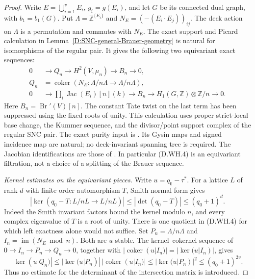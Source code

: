 \begin{proof}
Write \(E=\bigcup_{i=1}^v E_i\), \(g_i=g(E_i)\),
and let \(G\) be its connected dual graph, with
\(b_1=b_1(G)\). Put
\(\Lambda=\mathbb Z^{\{E_i\}}\) and
\(N_E=(-(E_i\cdot E_j))_{ij}\).
The deck action on \(\Lambda\) is a permutation
and commutes with \(N_E\).
The exact support and Picard calculation in
Lemma~\ref{D:SNC-general-Brauer-geometry} is natural
for isomorphisms of the regular pair. It gives
the following two equivariant exact sequences:
\[
 \begin{aligned}
 0&\longrightarrow Q_n\longrightarrow H^2(V,\mu_n)
             \longrightarrow B_n\longrightarrow0,\\
 Q_n&=\operatorname{coker}(N_E:\Lambda/n\Lambda
                                      \to\Lambda/n\Lambda),\\
 0&\longrightarrow\prod_i\operatorname{Jac}(E_i)[n](k)
       \longrightarrow B_n
       \longrightarrow H_1(G,\mathbb Z)\otimes\mathbb Z/n
       \longrightarrow0.
 \end{aligned}                                         \tag{D.WH.4}
\]
Here \(B_n=\operatorname{Br}'(V)[n]\).
The constant Tate twist on the last term has been
suppressed using the fixed roots of unity.
This calculation uses proper strict-local base change,
the Kummer sequence, and the divisor/point support
complex of the regular SNC pair. The exact purity
input is \citet[Expose XVI, Theorem 3.1.1 and the
complete proof of Corollary 3.1.3]{A_ILO2014}.
Its Gysin maps and signed incidence map are natural;
no deck-invariant spanning tree is required.
The Jacobian identifications are those of
\citet[Lemma 59.69.1, Tag 03RQ]{StacksLocalPairCohomologyB}.
In particular (D.WH.4) is an equivariant filtration,
not a choice of a splitting of the Brauer sequence.

\emph{Kernel estimates on the equivariant pieces.}
Write \(u=q_0-\tau^*\). For a lattice \(L\) of rank
\(d\) with finite-order automorphism \(T\), Smith
normal form gives
\[
 |\ker(q_0-T:L/nL\to L/nL)|
       \le|\det(q_0-T)|\le(q_0+1)^d.                   \tag{D.WH.5}
\]
Indeed the Smith invariant factors bound the kernel
modulo \(n\), and every complex eigenvalue of \(T\)
is a root of unity.
There is one quotient in (D.WH.4) for which
left exactness alone would not suffice. Set
\(P_n=\Lambda/n\Lambda\) and
\(I_n=\operatorname{im}(N_E\bmod n)\).
Both are \(u\)-stable. The kernel--cokernel sequence
of \(0\to I_n\to P_n\to Q_n\to0\), together with
\(|\operatorname{coker}(u|I_n)|=|\ker(u|I_n)|\), gives
\[
 |\ker(u|Q_n)|
 \le|\ker(u|P_n)|\,|\operatorname{coker}(u|I_n)|
 \le|\ker(u|P_n)|^2
 \le(q_0+1)^{2v}.                                     \tag{D.WH.6}
\]
Thus no estimate for the determinant of the
intersection matrix is introduced.


\end{proof}
